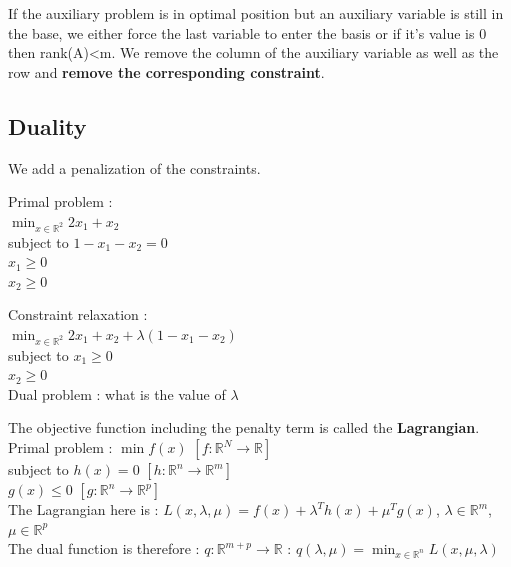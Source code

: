 \documentclass[../main.tex]{subfiles}
\begin{document}
\warning If the auxiliary problem is in optimal position but an auxiliary variable is still in the base, we either force the last variable to enter the basis or if it's value is 0 then rank(A)<m. We remove the column of the auxiliary variable as well as the row and \textbf{remove the corresponding constraint}.\\


\subsection{Duality}
We add a penalization of the constraints.\\
\begin{minipage}{.5\textwidth}
    Primal problem : \\
    $\min_{x\in \mathbb{R}^2} 2x_1+x_2$\\
    subject to $1-x_1-x_2=0$\\
    $x_1\geq 0$\\
    $x_2 \geq 0$\\
\end{minipage}
\begin{minipage}{.5\textwidth}
    Constraint relaxation : \\
    $\min_{x\in \mathbb{R}^2} 2x_1+x_2+\lambda(1-x_1-x_2)$\\
    subject to $x_1\geq 0$\\
    $x_2 \geq 0$\\
    Dual problem : what is the value of $\lambda$\\
\end{minipage}

The objective function including the penalty term is called the \textbf{Lagrangian}.\\
Primal problem : $\min f(x)$ $[f:\mathbb{R}^N \rightarrow \mathbb{R}]$\\
subject to $h(x)=0$ $[h:\mathbb{R}^n \rightarrow \mathbb{R}^m]$\\
$g(x)\leq 0$ $[g:\mathbb{R}^n\rightarrow\mathbb{R}^p]$\\

The Lagrangian here is : $L(x,\lambda, \mu) = f(x) + \lambda^T h(x) + \mu^Tg(x)$, $\lambda\in \mathbb{R}^m$, $\mu\in \mathbb{R}^p$\\

The dual function is therefore : $q:\mathbb{R}^{m+p} \rightarrow \mathbb{R}$ : $q(\lambda, \mu) = \min_{x\in \mathbb{R}^n} L(x,\mu,\lambda)$\\
\end{document}
